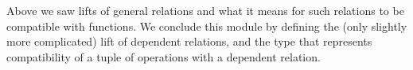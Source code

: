 Above we saw lifts of general relations and what it means for such relations to be compatible with functions. We conclude this module by defining the (only slightly more complicated) lift of dependent relations, and the type that represents compatibility of a tuple of operations with a dependent relation.
\ccpad
\begin{code}%
\>[0]\AgdaSpace{}%
\AgdaModule{\AgdaUnderscore{}}\AgdaSpace{}%
\AgdaSymbol{\{}\AgdaSpace{}%
\AgdaSpace{}%
\AgdaSpace{}%
\AgdaSymbol{:}\AgdaSpace{}%
\AgdaSymbol{\}}\AgdaSpace{}%
\AgdaSymbol{\{}\AgdaSpace{}%
\AgdaSpace{}%
\AgdaSymbol{:}\AgdaSpace{}%
\AgdaSpace{}%
\AgdaSymbol{\}}\AgdaSpace{}%
\AgdaSymbol{\{}\AgdaSpace{}%
\AgdaSymbol{:}\AgdaSpace{}%
\AgdaSpace{}%
\AgdaSpace{}%
\AgdaSpace{}%
\AgdaSymbol{\}}\AgdaSpace{}%
\<%
\\
%
\\[\AgdaEmptyExtraSkip]%
\>[0][@{}l@{\AgdaIndent{0}}]%
\>[1]\AgdaSpace{}%
\AgdaSymbol{:}\AgdaSpace{}%
\AgdaSpace{}%
\AgdaSpace{}%
\AgdaSpace{}%
\AgdaSpace{}%
\AgdaSpace{}%
\AgdaSpace{}%
\AgdaSpace{}%
\AgdaSpace{}%
\AgdaSpace{}%
\AgdaSpace{}%
\AgdaSpace{}%
\AgdaSymbol{)}\AgdaSpace{}%
\AgdaSpace{}%
\AgdaSpace{}%
\AgdaSpace{}%
\AgdaSpace{}%
\<%
\\
%
\>[1]\AgdaSpace{}%
\AgdaSpace{}%
\AgdaSpace{}%
\AgdaSymbol{=}\AgdaSpace{}%
\AgdaSpace{}%
\AgdaSymbol{(}\AgdaSpace{}%
\AgdaSymbol{:}\AgdaSpace{}%
\AgdaSymbol{)}\AgdaSpace{}%
\AgdaSpace{}%
\AgdaSpace{}%
\AgdaSpace{}%
\AgdaSpace{}%
\AgdaSpace{}%
\AgdaSymbol{(}\AgdaSpace{}%
\AgdaSymbol{)}\AgdaSpace{}%
\AgdaSymbol{)}\<%
\\
%
\\[\AgdaEmptyExtraSkip]%
%
\>[1]\AgdaSpace{}%
\AgdaSymbol{:}\AgdaSpace{}%
\AgdaSpace{}%
\AgdaSpace{}%
\AgdaSpace{}%

\end{code}

